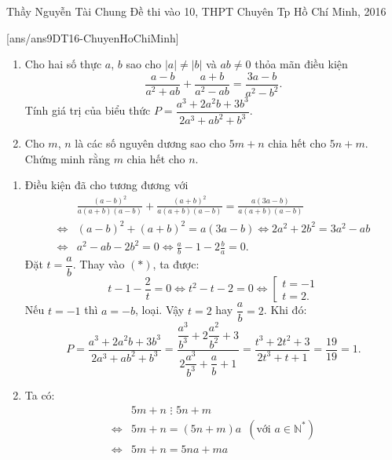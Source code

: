 \begin{name}
{Thầy  Nguyễn Tài Chung}
{Đề thi vào 10, THPT Chuyên Tp Hồ Chí Minh, 2016}
\end{name}
\setcounter{ex}{0}
[ans/ans9DT16-ChuyenHoChiMinh]
\begin{ex}%
    \hfill
    \begin{enumerate}
        \item Cho hai số thực $a$, $b$ sao cho $|a| \ne |b|$ và $ab \ne 0$ thỏa mãn điều kiện
        $$\dfrac{a - b}{a^2 + ab} + \frac{a + b}{a^2 - ab} = \frac{3a - b}{a^2 - b^2}.$$
        Tính giá trị của biểu thức $P = \dfrac{a^3 + 2a^2b + 3b^3}{2a^3 + ab^2 + b^3}$.
        \item Cho $m$, $n$ là các số nguyên dương sao cho $5m+n$ chia hết cho $5n+m$. Chứng minh rằng $m$ chia hết cho $n$.
    \end{enumerate}
\loigiai
    {
    \begin{enumerate}
        \item Điều kiện đã cho tương đương với 
 {\allowdisplaybreaks
 \begin{align*}
 &\frac{(a - b)^2}{a(a + b)(a - b)} + \frac{(a + b)^2}{a(a + b)(a - b)} = \frac{a(3a - b)}{a(a + b)(a - b)}\\
 \Leftrightarrow& (a - b)^2 + (a + b)^2 = a(3a - b) \Leftrightarrow 2a^2 + 2b^2 = 3a^2 - ab\\
 \Leftrightarrow& a^2 - ab - 2b^2 = 0 \Leftrightarrow \frac{a}{b} - 1 - 2\frac{b}{a} = 0.\tag{*}
 \end{align*}}Đặt $t = \dfrac{a}{b}$. Thay vào $(*)$, ta được:
$$t - 1 - \frac{2}{t} = 0 \Leftrightarrow t^2 - t - 2 = 0 \Leftrightarrow \left[ \begin{array}{l}
t =  - 1\\
t = 2.
\end{array} \right.$$
Nếu $t=-1$ thì $a=-b$, loại. Vậy $t=2$ hay $\dfrac{a}{b} = 2$. Khi đó:
$$P = \frac{a^3 + 2a^2b + 3b^3}{2a^3 + ab^2 + b^3} = \frac{{\dfrac{a^3}{b^3} + 2\dfrac{a^2}{b^2} + 3}}{{2\dfrac{a^3}{b^3} + \dfrac{a}{b} + 1}} = \frac{t^3 + 2t^2 + 3}{2t^3 + t + 1} = \frac{19}{19} = 1.$$
        \item Ta có:
{\allowdisplaybreaks
\begin{align*}
&5m + n\,\, \vdots \,\,5n + m\\
\Leftrightarrow& 5m + n = (5n + m)a\,\,\,(\text{với} \,\,a \in \mathbb{N}^*)\\
\Leftrightarrow& 5m + n = 5na + ma\\

\end{align*}}
\end{enumerate}}
\end{ex}
